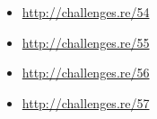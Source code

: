 \section{\Exercises}

\begin{itemize}
	\item \url{http://challenges.re/54}
	\item \url{http://challenges.re/55}
	\item \url{http://challenges.re/56}
	\item \url{http://challenges.re/57}
\end{itemize}

